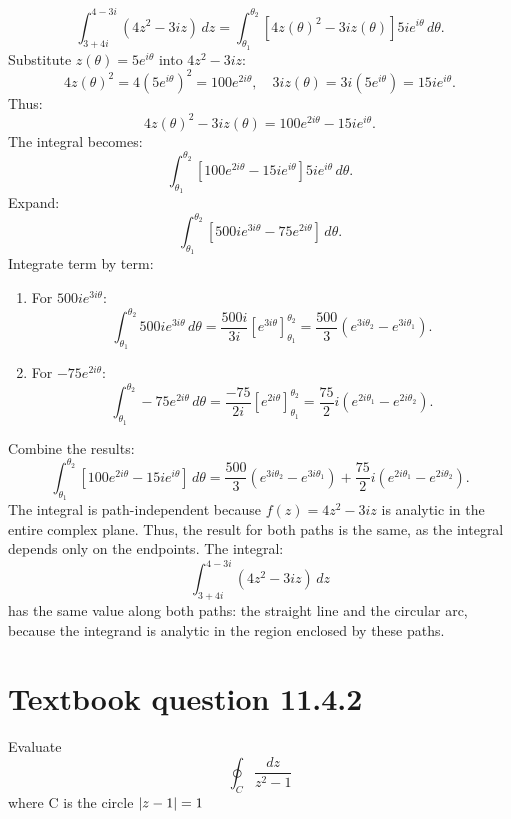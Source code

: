 \documentclass[12pt]{article}
\begin{document}
           \[
           \int_{3+4i}^{4-3i} (4z^2 - 3iz) \, dz = \int_{\theta_1}^{\theta_2} \left[ 4z(\theta)^2 - 3i z(\theta) \right] 5i e^{i\theta} \, d\theta.
           \]
        Substitute \(z(\theta) = 5e^{i\theta}\) into \(4z^2 - 3iz\):
        \[
        4z(\theta)^2 = 4(5e^{i\theta})^2 = 100e^{2i\theta}, \quad 3iz(\theta) = 3i(5e^{i\theta}) = 15ie^{i\theta}.
        \]
        Thus:
        \[
        4z(\theta)^2 - 3iz(\theta) = 100e^{2i\theta} - 15ie^{i\theta}.
        \]
        The integral becomes:
        \[
        \int_{\theta_1}^{\theta_2} \left[ 100e^{2i\theta} - 15ie^{i\theta} \right] 5i e^{i\theta} \, d\theta.
        \]
        Expand:
        \[
        \int_{\theta_1}^{\theta_2} \left[ 500i e^{3i\theta} - 75 e^{2i\theta} \right] \, d\theta.
        \]
        Integrate term by term:
        \begin{enumerate}
            \item For \(500i e^{3i\theta}\):
                \[
                    \int_{\theta_1}^{\theta_2} 500i e^{3i\theta} \, d\theta = \frac{500i}{3i} \left[ e^{3i\theta} \right]_{\theta_1}^{\theta_2} = \frac{500}{3} \left( e^{3i\theta_2} - e^{3i\theta_1} \right).
                \]
            \item For \(-75 e^{2i\theta}\):
                \[
                    \int_{\theta_1}^{\theta_2} -75 e^{2i\theta} \, d\theta = \frac{-75}{2i} \left[ e^{2i\theta} \right]_{\theta_1}^{\theta_2} = \frac{75}{2}i \left( e^{2i\theta_1} - e^{2i\theta_2} \right).
                \]
        \end{enumerate}
        Combine the results:
        \[
        \int_{\theta_1}^{\theta_2} \left[ 100e^{2i\theta} - 15ie^{i\theta} \right] \, d\theta = \frac{500}{3} \left( e^{3i\theta_2} - e^{3i\theta_1} \right) + \frac{75}{2}i \left( e^{2i\theta_1} - e^{2i\theta_2} \right).
        \]
        The integral is path-independent because \(f(z) = 4z^2 - 3iz\) is analytic in the entire complex plane. Thus, the result for both paths is the same, as the integral depends only on the endpoints.
        The integral:
        \[
        \int_{3 + 4i}^{4 - 3i} (4z^2 - 3iz) \, dz
        \]
        has the same value along both paths: the straight line and the circular arc, because the integrand is analytic in the region enclosed by these paths.

\section*{Textbook question 11.4.2}
    Evaluate
    \[
        \oint_C \frac{dz}{z^2 - 1}
    \]
    where C is the circle $\abs{z-1} = 1$
\end{document}
